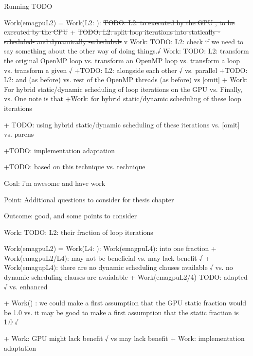 \documentclass[serif, mathserif, final]{beamer}
\newcommand{\doneTaskNoItem}[1]{\sout{#1}}
\begin{document}
\begin{frame}
\begin{columns}
\begin{column}{0.50\linewidth}
\begin{block}{Running TODO}
\begin{enumerate}
{        \item \small Work(emagpuL2) = Work(L2:  ): 
          \doneTaskNoItem{TODO: L2: to executed by the GPU  , to be
            executed by the CPU}  +  \doneTaskNoItem{TODO: L2: split
            loop iterations into statically -scheduled- and
            dynamically -scheduled-} v
          Work: TODO: L2: check if we need to say something about the
          other way of doing things.√  
          Work: TODO: L2: transform the original OpenMP loop vs. transform an
          OpenMP loop vs. transform a loop vs. transform a given √         
          +TODO: L2: alongside each other √ vs. parallel 
          +TODO: L2: and (as before)  vs. rest of the OpenMP threads
          (as before) vs [omit] 
          + Work: For hybrid static/dynamic scheduling of loop
          iterations on the GPU vs. Finally, vs. One note is that 
          +Work: for hybrid static/dynamic scheduling of these loop
          iterations  

          + TODO: using hybrid static/dynamic scheduling of these
          iterations vs. [omit] vs. parens

          +TODO: implementation adaptation 

          +TODO: based on this technique vs. technique
          
          Goal: i'm awesome and have work
          
          Point: Additional questions to consider for thesis chapter
          
          Outcome: good, and some points to consider
                 
          Work: TODO: L2: their fraction of loop iterations 
        \item \small Work(emagpuL2) = Work(L4: ): 
          Work(emagpuL4): into one fraction  
          + Work(emagpuL2/L4): may not be beneficial vs. may lack
          benefit √
          + Work(emagupL4): there are no dynamic scheduling clauses
          available √ vs. no dynamic scheduling clauses are avaialable
          + Work(emagpuL2/4) TODO: adapted √  vs. enhanced 

          + Work() : we could make a first assumption that the GPU static
          fraction would be 1.0  vs. 
          it may be good to make a first assumption that the static
          fraction is 1.0 √

          + Work: GPU might lack benefit √ vs may lack benefit 
          + Work: implementation adaptation 
}


\end{enumerate}
\end{block}
\end{column}
\end{columns}
\end{frame}
\end{document}
